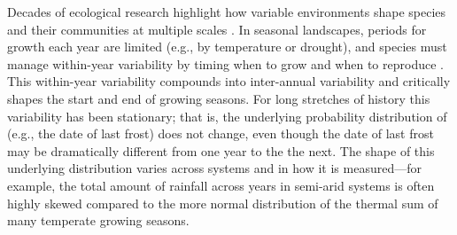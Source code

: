 \documentclass[11pt,letterpaper]{article}
\begin{document}
Decades of ecological research highlight how variable environments shape species and their communities at multiple scales \citep{Sale:1977oq,Chesson:1997dz}.  In seasonal landscapes, periods for growth each year are limited (e.g., by temperature or drought), and species must manage within-year variability by timing when to grow and when to reproduce \citep{donohue2002}. This within-year variability compounds into inter-annual variability and critically shapes the start and end of growing seasons. For long stretches of history this variability has been stationary; that is, the underlying probability distribution of (e.g., the date of last frost) does not change, even though the date of last frost may be dramatically different from one year to the the next. The shape of this underlying distribution varies across systems and in how it is measured---for example, the total amount of rainfall across years in semi-arid systems is often highly skewed compared to the more normal distribution of the thermal sum of many temperate growing seasons. %
\end{document}
